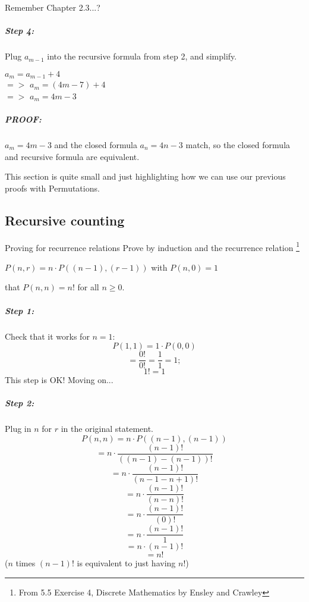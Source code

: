 {\begin{intro}{Remember Chapter 2.3...?}
        \subparagraph{Step 4:} Plug $a_{m-1}$ into the recursive formula from step 2, and simplify.

            \tab $a_{m} = a_{m-1} + 4$ \\
            \tab $=>$   $a_{m} = (4m-7) + 4$ \\
            \tab $=>$   $a_{m} = 4m - 3$

        \subparagraph{PROOF:} $a_{m} = 4m-3$ and the closed formula $a_{n} = 4n-3$ match,
            so the closed formula and recursive formula are equivalent.

    \end{intro}

    This section is quite small and just highlighting how we can use
    our previous proofs with Permutations.

    \newpage
    
    \subsection{Recursive counting}

    \begin{intro}{Proving for recurrence relations}
        Prove by induction and the recurrence relation
        \footnote{From 5.5 Exercise 4, Discrete Mathematics by Ensley and Crawley}
        
        $P(n,r) = n \cdot P((n-1), (r-1))$ with $P(n,0)=1$
            
        \begin{center}
            that $P(n,n) = n!$ for all $n \geq 0$.
        \end{center}
        
        
        \subparagraph{Step 1:} Check that it works for $n=1$: \\
            $$P(1,1) = 1 \cdot P(0, 0)$$
            $$ = \frac{0!}{0!} = \frac{1}{1} = 1;$$
            $$ 1! = 1 $$
            This step is OK! Moving on...

        \subparagraph{Step 2:}  Plug in $n$ for $r$ in the original statement. 
            $$P(n,n) = n \cdot P( (n-1), (n-1) )$$
            $$= n \cdot \frac{(n-1)!}{( (n-1) - (n-1) )!}$$
            $$= n \cdot \frac{(n-1)!}{( n - 1 - n + 1 )!}$$
            $$= n \cdot \frac{(n-1)!}{( n - n )!}$$
            $$= n \cdot \frac{(n-1)!}{( 0 )!}$$
            $$= n \cdot \frac{(n-1)!}{1}$$
            $$= n \cdot (n-1)!$$
            $$= n!$$
            ($n$ times $(n-1)!$ is equivalent to just having $n!$)
            

\end{intro}}
